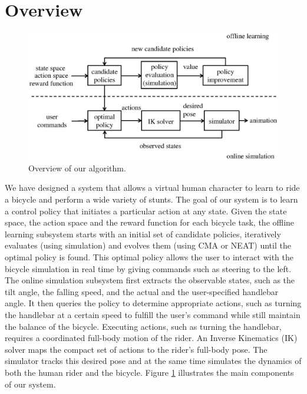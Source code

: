 \section{Overview}
\begin{figure}[!t]
  \centering
  \includegraphics[width=5.5in]{figures/overview}
  \caption{Overview of our algorithm.}
  \label{fig:overview}
\end{figure}

We have designed a system that allows a virtual human character to learn to ride a bicycle and perform a wide variety of stunts. The goal of our system is to learn a control policy that initiates a particular action at any state. Given the state space, the action space and the reward function for each bicycle task, the offline learning subsystem starts with an initial set of candidate policies, iteratively evaluates (using simulation) and evolves them (using CMA or NEAT) until the optimal policy is found. This optimal policy allows the user to interact with the bicycle simulation in real time by giving commands such as steering to the left. The online simulation subsystem first extracts the observable states, such as the tilt angle, the falling speed, and the actual and the user-specified handlebar angle. It then queries the policy to determine appropriate actions, such as turning the handlebar at a certain speed to fulfill the user's command while still maintain the balance of the bicycle. Executing actions, such as turning the handlebar, requires a coordinated full-body motion of the rider. An Inverse Kinematics (IK) solver maps the compact set of actions to the rider's full-body pose. The simulator tracks this desired pose and at the same time simulates the dynamics of both the human rider and the bicycle. Figure \ref{fig:overview} illustrates the main components of our system.

